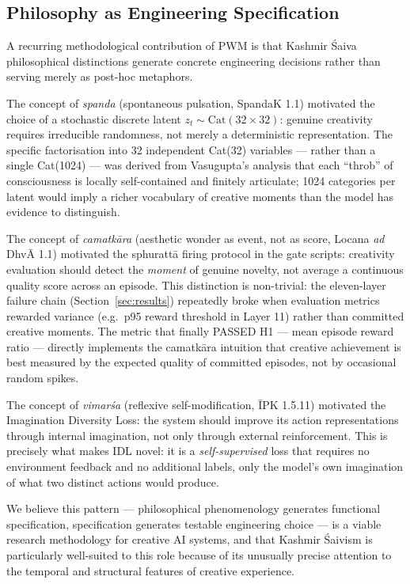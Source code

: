 \documentclass[journal,onecolumn,11pt]{IEEEtran}
\begin{document}
\subsection{Philosophy as Engineering Specification}

A recurring methodological contribution of PWM is that Kashmir Śaiva
philosophical distinctions generate concrete engineering decisions rather
than serving merely as post-hoc metaphors.

The concept of \emph{spanda} (spontaneous pulsation, SpandaK 1.1) motivated the
choice of a stochastic discrete latent $z_t \sim \text{Cat}(32{\times}32)$: genuine
creativity requires irreducible randomness, not merely a deterministic representation.
The specific factorisation into 32 independent Cat(32) variables — rather than a
single Cat(1024) — was derived from Vasugupta's analysis that each ``throb'' of
consciousness is locally self-contained and finitely articulate; 1024 categories
per latent would imply a richer vocabulary of creative moments than the model
has evidence to distinguish.

The concept of \emph{camatkāra} (aesthetic wonder as event, not as score, Locana
\emph{ad} DhvĀ 1.1) motivated the sphurattā firing protocol in the gate scripts:
creativity evaluation should detect the \emph{moment} of genuine novelty, not
average a continuous quality score across an episode.
This distinction is non-trivial: the eleven-layer failure chain (Section~\ref{sec:results})
repeatedly broke when evaluation metrics rewarded variance (e.g.\ p95 reward
threshold in Layer 11) rather than committed creative moments.
The metric that finally PASSED H1 — mean episode reward ratio — directly implements
the camatkāra intuition that creative achievement is best measured by the expected
quality of committed episodes, not by occasional random spikes.

The concept of \emph{vimarśa} (reflexive self-modification, ĪPK 1.5.11) motivated
the Imagination Diversity Loss: the system should improve its action representations
through internal imagination, not only through external reinforcement.
This is precisely what makes IDL novel: it is a \emph{self-supervised} loss that
requires no environment feedback and no additional labels, only the model's own
imagination of what two distinct actions would produce.

We believe this pattern — philosophical phenomenology generates functional
specification, specification generates testable engineering choice — is a viable
research methodology for creative AI systems, and that Kashmir Śaivism is
particularly well-suited to this role because of its unusually precise attention
to the temporal and structural features of creative experience.
\end{document}
